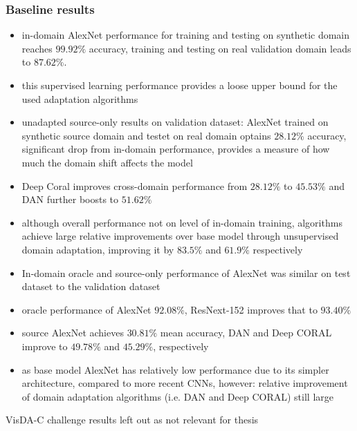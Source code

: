 \documentclass[]{article}
\begin{document}
\subsubsection{Baseline results}
\begin{itemize}
	\item in-domain AlexNet performance for training and testing on synthetic domain reaches $99.92\%$ accuracy, training and testing on real validation domain leads to $87.62\%$.
	\item this supervised learning performance provides a loose upper bound for the used adaptation algorithms
	\item unadapted source-only results on validation dataset: AlexNet trained on synthetic source domain and testet on real domain optains $28.12\%$ accuracy, significant drop from in-domain performance, provides a measure of how much the domain shift affects the model
	\item Deep Coral improves cross-domain performance from $28.12\%$ to $45.53\%$ and DAN further boosts to $51.62\%$
	\item although overall performance not on level of in-domain training, algorithms achieve large relative improvements over base model through unsupervised domain adaptation, improving it by $83.5\%$ and $61.9\%$ respectively
	\item In-domain oracle and source-only performance of AlexNet was similar on test dataset to the validation dataset
	\item oracle performance of AlexNet $92.08\%$, ResNext-152 improves that to $93.40\%$
	\item source AlexNet achieves $30.81\%$ mean accuracy, DAN and Deep CORAL improve to $49.78\%$ and $45.29\%$, respectively
	\item as base model AlexNet has relatively low performance due to its simpler architecture, compared to more recent CNNs, however: relative improvement of domain adaptation algorithms (i.e. DAN and Deep CORAL) still large
\end{itemize}

VisDA-C challenge results left out as not relevant for thesis
\end{document}
